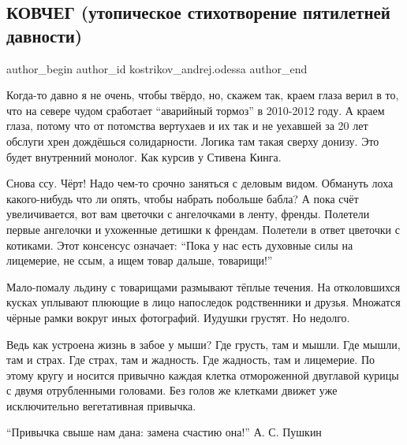  
 
 
 
 
 
\subsection{КОВЧЕГ (утопическое стихотворение пятилетней давности)}
\label{sec:16_03_2022.fb.kostrikov_andrej.odessa.1.kovcheg}
 
\ifcmt
 author_begin
   author_id kostrikov_andrej.odessa
 author_end
\fi

Когда-то давно я не очень, чтобы твёрдо, но, скажем так, краем глаза верил в
то, что на севере чудом сработает \enquote{аварийный тормоз} в 2010-2012 году. А краем
глаза, потому что от потомства вертухаев и их так и не уехавшей за 20 лет
обслуги хрен дождёшься солидарности. Логика там такая сверху донизу. Это будет
внутренний монолог. Как курсив у Стивена Кинга.

Снова ссу. Чёрт! Надо чем-то срочно заняться с деловым видом. Обмануть лоха
какого-нибудь что ли опять, чтобы набрать побольше бабла? А пока счёт
увеличивается, вот вам цветочки с ангелочками в ленту, френды. Полетели первые
ангелочки и ухоженные детишки к френдам. Полетели в ответ цветочки с котиками.
Этот консенсус означает: \enquote{Пока у нас есть духовные силы на лицемерие, не ссым,
а ищем товар дальше, товарищи!}

Мало-помалу льдину с товарищами размывают тёплые течения. На отколовшихся
кусках уплывают плюющие в лицо напоследок родственники и друзья. Множатся
чёрные рамки вокруг иных фотографий. Иудушки грустят. Но недолго.

Ведь как устроена жизнь в забое у мыши? Где грусть, там и мышли. Где мышли, там
и страх. Где страх, там и жадность. Где жадность, там и лицемерие. По этому
кругу и носится привычно каждая клетка отмороженной двуглавой курицы с двумя
отрубленными головами. Без голов же клетками движет уже исключительно
вегетативная привычка.

\enquote{Привычка свыше нам дана: замена счастию она!} А. С. Пушкин 

